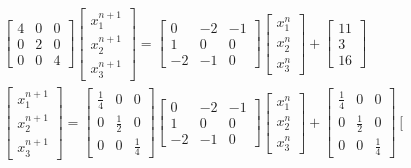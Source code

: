 \documentclass[10pt]{article}
\begin{document}
\[
\begin{aligned}
& {\left[\begin{array}{lll}
4 & 0 & 0 \\
0 & 2 & 0 \\
0 & 0 & 4
\end{array}\right]\left[\begin{array}{l}
x_{1}^{n+1} \\
x_{2}^{n+1} \\
x_{3}^{n+1}
\end{array}\right]=\left[\begin{array}{ccc}
0 & -2 & -1 \\
1 & 0 & 0 \\
-2 & -1 & 0
\end{array}\right]\left[\begin{array}{l}
x_{1}^{n} \\
x_{2}^{n} \\
x_{3}^{n}
\end{array}\right]+\left[\begin{array}{c}
11 \\
3 \\
16
\end{array}\right]} \\
& {\left[\begin{array}{l}
x_{1}^{n+1} \\
x_{2}^{n+1} \\
x_{3}^{n+1}
\end{array}\right]=\left[\begin{array}{ccc}
\frac{1}{4} & 0 & 0 \\
0 & \frac{1}{2} & 0 \\
0 & 0 & \frac{1}{4}
\end{array}\right]\left[\begin{array}{ccc}
0 & -2 & -1 \\
1 & 0 & 0 \\
-2 & -1 & 0
\end{array}\right]\left[\begin{array}{l}
x_{1}^{n} \\
x_{2}^{n} \\
x_{3}^{n}
\end{array}\right]+\left[\begin{array}{ccc}
\frac{1}{4} & 0 & 0 \\
0 & \frac{1}{2} & 0 \\
0 & 0 & \frac{1}{4}
\end{array}\right]\left[\begin{array}{c}

\end{array}}
\end{aligned}\]
\end{document}
